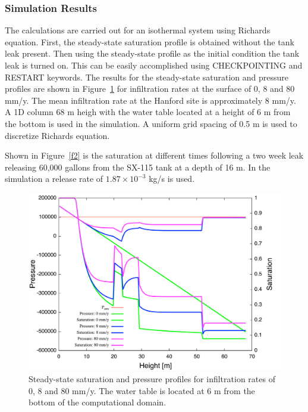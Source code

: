 \subsubsection{Simulation Results}

The calculations are carried out for an isothermal system using Richards equation. First, the steady-state saturation profile is obtained without the tank leak present. Then using the steady-state profile as the initial condition the tank leak is turned on. This can be easily accomplished using CHECKPOINTING and RESTART keywords. The results for the steady-state saturation and pressure profiles are shown in Figure~\ref{f1} for infiltration rates at the surface of 0, 8 and 80 mm/y. The mean infiltration rate at the Hanford site is approximately 8 mm/y. A 1D column 68 m heigh with the water table located at a height of 6 m from the bottom is used in the simulation. A uniform grid spacing of 0.5 m is used to discretize Richards equation.

Shown in Figure~\ref{f2} is the saturation at different times following a two week leak releasing 60,000 gallons from the SX-115 tank at a depth of 16 m. In the simulation a release rate of $1.87\!\times\! 10^{-3}$ kg/s is used.


\clearpage

\begin{figure}[h]\centering
\includegraphics[scale=0.45]{./figs/ps}
\caption{Steady-state saturation and pressure profiles for infiltration rates of 0, 8 and 80 mm/y. The water table is located at 6 m from the bottom of the computational domain.}\label{f1}
\end{figure}


